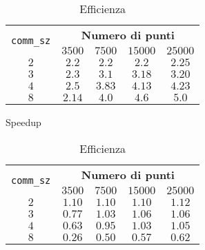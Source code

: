 \documentclass[a4paper, 11pt]{article}
\theoremstyle{definition}
\theoremstyle{remark}
\begin{document}
\begin{table}
\centering
\setlength\tabcolsep{4pt}
\begin{minipage}{0.48\textwidth}
\centering
\begin{tabular}{c|cccc}
\multirow{2}{*}{\texttt{comm\_sz}}
  & \multicolumn{4}{c}{\textbf{Numero di punti}} \\
  & $3500$ & $7500$ & $15000$ & $25000$ \\
\hline
$2$ & $2.2$ & $2.2$ & $2.2$ & $2.25$ \\
$3$ & $2.3$ & $3.1$ & $3.18$ & $3.20$ \\
$4$ & $2.5$ & $3.83$ & $4.13$ & $4.23$ \\
$8$ & $2.14$ & $4.0$ & $4.6$ & $5.0$ \\
\end{tabular}
\caption{Speedup}
\label{t3}
\end{minipage}
\hfill
\begin{minipage}{0.48\textwidth}
\centering
\begin{tabular}{c|cccc}
\multirow{2}{*}{\texttt{comm\_sz}}
  & \multicolumn{4}{c}{\textbf{Numero di punti}} \\
  & $3500$ & $7500$ & $15000$ & $25000$ \\
\hline
$2$ & $1.10$ & $1.10$ & $1.10$ & $1.12$ \\
$3$ & $0.77$ & $1.03$ & $1.06$ & $1.06$ \\
$4$ & $0.63$ & $0.95$ & $1.03$ & $1.05$ \\
$8$ & $0.26$ & $0.50$ & $0.57$ & $0.62$ \\
\end{tabular}
\caption{Efficienza}
\label{t4}
\end{minipage}
\end{table}
\end{document}
